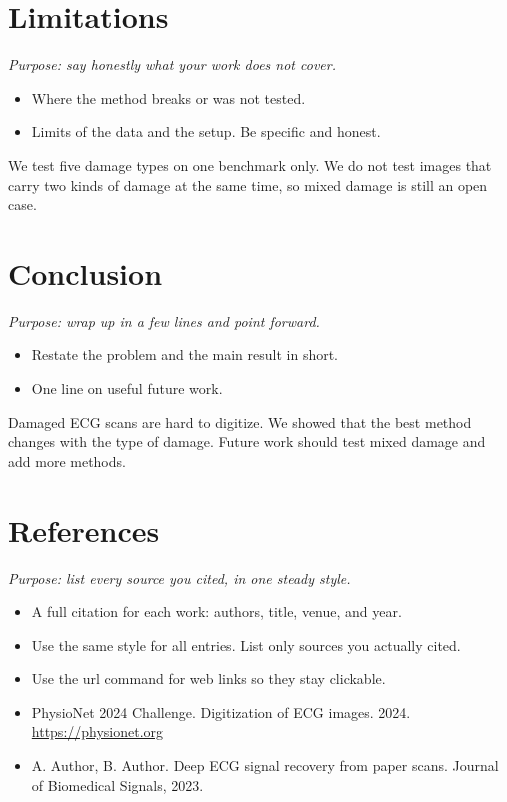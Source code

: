 \documentclass[11pt]{article}
\begin{document}
\section{Limitations}
\textit{Purpose: say honestly what your work does not cover.}

\begin{itemize}
\item Where the \textcolor{cMethod}{method} breaks or was not tested.
\item Limits of the data and the setup. Be specific and honest.
\end{itemize}


We test five damage types on one benchmark only. \textcolor{cProblem}{We do not test images that carry two kinds of damage at the same time,} so mixed damage is still an open case.

\section{Conclusion}
\textit{Purpose: wrap up in a few lines and point forward.}

\begin{itemize}
\item Restate the \textcolor{cProblem}{problem} and the main \textcolor{cResult}{result} in short.
\item One line on useful future work.
\end{itemize}


\textcolor{cProblem}{Damaged ECG scans are hard to digitize.} \textcolor{cResult}{We showed that the best method changes with the type of damage.} Future work should test mixed damage and add more methods.

\section{References}
\textit{Purpose: list every source you cited, in one steady style.}

\begin{itemize}
\item A full citation for each work: authors, title, venue, and year.
\item Use the same style for all entries. List only sources you actually cited.
\item Use the url command for web links so they stay clickable.
\end{itemize}

\begin{itemize}
\item PhysioNet 2024 Challenge. Digitization of ECG images. 2024. \url{https://physionet.org}
\item A. Author, B. Author. Deep ECG signal recovery from paper scans. Journal of Biomedical Signals, 2023.
\end{itemize}
\end{document}
